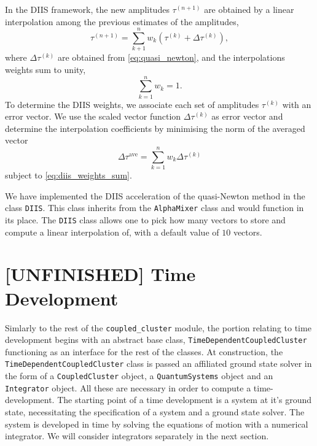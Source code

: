     In the DIIS framework\cite{pulay1980convergence}, the new amplitudes 
    $\tau^{(n+1)}$ are obtained by a linear interpolation among the previous 
    estimates of the amplitudes,
    \begin{equation}
        \tau^{(n+1)} = \sum_{k+1}^n w_k(\tau^{(k)} + \Delta\tau^{(k)}),
    \end{equation}
    where $\Delta\tau^{(k)}$ are obtained from \autoref{eq:quasi_newton}, and 
    the interpolations weights sum to unity,
    \begin{equation*}
        \label{eq:diis_weights_sum}
        \sum_{k=1}^n w_k = 1.
    \end{equation*}
    To determine the DIIS weights, we associate each set of amplitudes $\tau^{(k)}$ 
    with an error vector. We use the scaled vector function $\Delta\tau^{(k)}$ as 
    error vector and determine the interpolation coefficients by minimising the norm of 
    the averaged vector
    \begin{equation}
        \Delta \tau^{\text{ave}} = \sum_{k=1}^n w_k \Delta \tau^{(k)}
    \end{equation}
    subject to \autoref{eq:diis_weights_sum}.

    We have implemented the DIIS acceleration of the quasi-Newton method in the class 
    \lstinline{DIIS}. This class inherits from the \lstinline{AlphaMixer} class and
    would function in its place. The \lstinline{DIIS} class allows one to pick 
    how many vectors to store and compute a linear interpolation of, with a default 
    value of $10$ vectors.

    

\section{[UNFINISHED] Time Development}

    Simlarly to the rest of the \lstinline{coupled_cluster} module, the portion relating
    to time development begins with an abstract base class,
    \lstinline{TimeDependentCoupledCluster}
    functioning as an interface for the rest of the classes. At construction, the 
    \lstinline{TimeDependentCoupledCluster} class is passed an affiliated 
    ground state solver in the form of a \lstinline{CoupledCluster} object, a 
    \lstinline{QuantumSystems} object and an \lstinline{Integrator} object. All these 
    are necessary in order to compute a time-development. The starting point of a 
    time development is a system at it's ground state, necessitating the specification 
    of a system and a ground state solver. The system is developed in time by solving 
    the equations of motion with a numerical integrator. We will consider 
    integrators separately in the next section.

